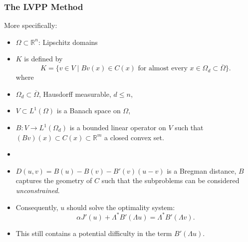 \documentclass[aspectratio=169,xcolor=dvipsnames,11pt]{beamer}
\begin{document}
\begin{frame}\frametitle{The LVPP Method}
More specifically:
\begin{itemize}
\item $\Omega \subset \mathbb{R}^n$:  Lipschitz domains
\item $K$ is defined by
\begin{equation} \label{eq:intro:feasible_set}
K = \{ v \in V \mid Bv(x) \in C(x) \text{ for almost every } x \in \Omega_d \subset \overline{\Omega} \}.
\end{equation}
where
\item $\Omega_d\subset \overline{\Omega}$, Hausdorff measurable, $d \le n$,
\item $V \subset L^1(\Omega)$ is a Banach space on $\Omega$, 
\item $B \colon V \to L^1(\Omega_d)$ is a bounded linear operator on $V$ such that $(Bv)(x) \subset C(x) \subset \mathbb{R}^m$ a closed convex set.
\item 

\item  $D(u,v) = B(u) - B(v) - B'(v)(u - v)$ is a Bregman distance, $B$ captures the geometry of $C$ such that the subproblems can be considered \textit{unconstrained}.
\item  Consequently, $u$ should solve the optimality system:
\[
\alpha J'(u) + \Lambda^* B'(\Lambda u) = \Lambda^* B'(\Lambda v).
\]
\item  This still contains a potential difficulty in the term $B'(\Lambda u)$.
\end{itemize}
\end{frame}
\end{document}
